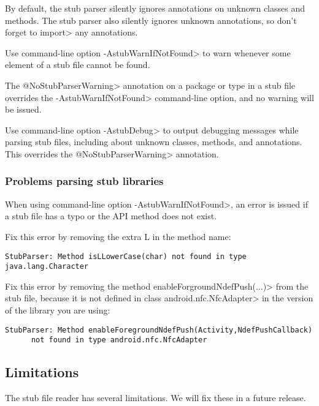 By default, the stub parser silently ignores
annotations on unknown classes and methods.
The stub parser also silently ignores unknown annotations, so don't forget to
\<import> any annotations.

Use command-line option
\<-AstubWarnIfNotFound> to warn whenever some element of a stub file cannot
be found.

The \<@NoStubParserWarning> annotation on a package or type in a stub file
overrides the \<-AstubWarnIfNotFound> command-line option, and no warning
will be issued.

Use command-line option \<-AstubDebug> to output debugging messages while
parsing stub files, including about unknown classes, methods, and
annotations.  This overrides the \<@NoStubParserWarning> annotation.



\subsubsection{Problems parsing stub libraries}

When using command-line option \<-AstubWarnIfNotFound>,
an error is issued if a stub file has a typo or the API method does not
exist.

Fix this error by removing the extra L in the method name:
\begin{Verbatim}
StubParser: Method isLLowerCase(char) not found in type java.lang.Character
\end{Verbatim}

Fix this error by removing the method \<enableForgroundNdefPush(...)> from
the stub file, because it is not defined in class \<android.nfc.NfcAdapter>
in the version of the library you are using:
\begin{Verbatim}
StubParser: Method enableForegroundNdefPush(Activity,NdefPushCallback)
      not found in type android.nfc.NfcAdapter
\end{Verbatim}


\subsection{Limitations\label{stub-limitations}}

The stub file reader has several limitations.  We will fix these in a
future release.

